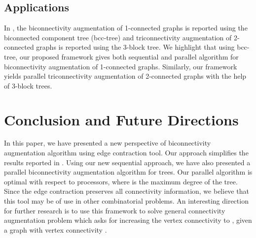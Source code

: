 \documentclass[runningheads]{llncs}
\begin{document}
\subsection{Applications}
In \cite{nsn}, the biconnectivity augmentation of 1-connected graphs is reported using the biconnected component tree (bcc-tree) and triconnectivity augmentation of 2-connected graphs is reported using the 3-block tree.  We highlight that using bcc-tree, our proposed framework gives both sequential and parallel algorithm for biconnectivity augmentation of 1-connected graphs.  Similarly, our framework yields parallel triconnectivity augmentation of 2-connected graphs with the help of 3-block trees.
\section{Conclusion and Future Directions}
In this paper, we have presented a new perspective of biconnectivity augmentation algorithm using edge contraction tool.  Our approach simplifies the results reported in \cite{nsn}.  Using our new sequential approach, we have also presented a parallel biconnectivity augmentation algorithm for trees.  Our parallel algorithm is optimal with respect to  processors, where  is the maximum degree of the tree.   Since the edge contraction preserves all connectivity information,  we believe that this tool may be of use in other combinatorial problems.  An interesting direction for further research is to use this framework to solve general connectivity augmentation problem which asks for increasing the vertex connectivity to , given a graph with vertex connectivity .
\end{document}
